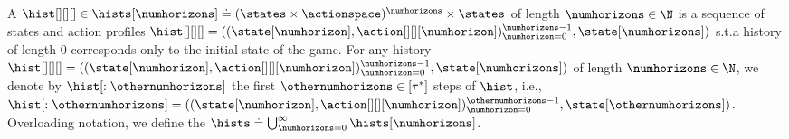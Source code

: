 A  $\hist[][][] \in \hists[\numhorizons] \doteq (\states \times \actionspace)^\numhorizons \times \states$ of length $\numhorizons \in \N$ is a sequence of states and action profiles $\hist[][][] = ((\state[\numhorizon], \action[][][\numhorizon])_{\numhorizon = 0}^{\numhorizons-1}, \state[\numhorizons])$
s.t.\@ a history of length $0$ corresponds only to the initial state of the game. %
For any history $\hist[][][] = ((\state[\numhorizon], \action[][][\numhorizon])_{\numhorizon = 0}^{\numhorizons-1}, \state[\numhorizons])$ of length $\numhorizons \in \N$, we denote by $\hist[: \othernumhorizons]$ the first $\othernumhorizons \in [\tau^*]$ steps of $\hist$, i.e., $\hist[: \othernumhorizons] = ((\state[\numhorizon], \action[][][\numhorizon])_{\numhorizon = 0}^{\othernumhorizons-1}, \state[\othernumhorizons])$.
Overloading notation, we define the  $\hists \doteq \bigcup_{\numhorizons = 0}^\infty \hists[\numhorizons]$.
